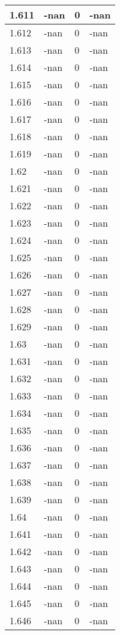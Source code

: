\documentclass[a4paper,14pt]{extarticle}
\begin{document}
\begin{longtable}{||m{3cm}||m{3cm}|m{3cm}||m{3cm}||}
\hline
1.611 & -nan & 0 & -nan\\
\hline
1.612 & -nan & 0 & -nan\\
\hline
1.613 & -nan & 0 & -nan\\
\hline
1.614 & -nan & 0 & -nan\\
\hline
1.615 & -nan & 0 & -nan\\
\hline
1.616 & -nan & 0 & -nan\\
\hline
1.617 & -nan & 0 & -nan\\
\hline
1.618 & -nan & 0 & -nan\\
\hline
1.619 & -nan & 0 & -nan\\
\hline
1.62 & -nan & 0 & -nan\\
\hline
1.621 & -nan & 0 & -nan\\
\hline
1.622 & -nan & 0 & -nan\\
\hline
1.623 & -nan & 0 & -nan\\
\hline
1.624 & -nan & 0 & -nan\\
\hline
1.625 & -nan & 0 & -nan\\
\hline
1.626 & -nan & 0 & -nan\\
\hline
1.627 & -nan & 0 & -nan\\
\hline
1.628 & -nan & 0 & -nan\\
\hline
1.629 & -nan & 0 & -nan\\
\hline
1.63 & -nan & 0 & -nan\\
\hline
1.631 & -nan & 0 & -nan\\
\hline
1.632 & -nan & 0 & -nan\\
\hline
1.633 & -nan & 0 & -nan\\
\hline
1.634 & -nan & 0 & -nan\\
\hline
1.635 & -nan & 0 & -nan\\
\hline
1.636 & -nan & 0 & -nan\\
\hline
1.637 & -nan & 0 & -nan\\
\hline
1.638 & -nan & 0 & -nan\\
\hline
1.639 & -nan & 0 & -nan\\
\hline
1.64 & -nan & 0 & -nan\\
\hline
1.641 & -nan & 0 & -nan\\
\hline
1.642 & -nan & 0 & -nan\\
\hline
1.643 & -nan & 0 & -nan\\
\hline
1.644 & -nan & 0 & -nan\\
\hline
1.645 & -nan & 0 & -nan\\
\hline
1.646 & -nan & 0 & -nan\\

\end{longtable}
\end{document}
